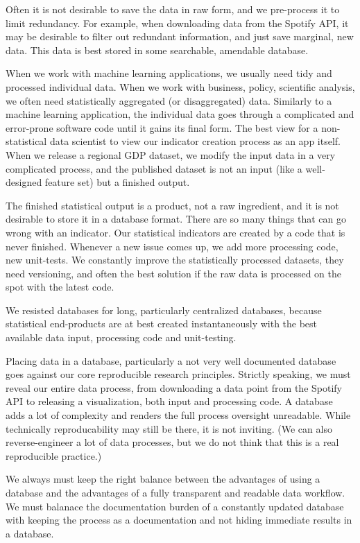 \documentclass[
  fontsize=13pt,
  english,
  a4paper,
  openany, a4paper, oneside]{article}
\begin{document}
Often it is not desirable to save the data in raw form, and we pre-process it to limit redundancy. For example, when downloading data from the Spotify API, it may be desirable to filter out redundant information, and just save marginal, new data. This data is best stored in some searchable, amendable database.

When we work with machine learning applications, we usually need tidy and processed individual data. When we work with business, policy, scientific analysis, we often need statistically aggregated (or disaggregated) data. Similarly to a machine learning application, the individual data goes through a complicated and error-prone software code until it gains its final form. The best view for a non-statistical data scientist to view our indicator creation process as an app itself. When we release a regional GDP dataset, we modify the input data in a very complicated process, and the published dataset is not an input (like a well-designed feature set) but a finished output.

The finished statistical output is a product, not a raw ingredient, and it is not desirable to store it in a database format. There are so many things that can go wrong with an indicator. Our statistical indicators are created by a code that is never finished. Whenever a new issue comes up, we add more processing code, new unit-tests. We constantly improve the statistically processed datasets, they need versioning, and often the best solution if the raw data is processed on the spot with the latest code.

We resisted databases for long, particularly centralized databases, because statistical end-products are at best created instantaneously with the best available data input, processing code and unit-testing.

Placing data in a database, particularly a not very well documented database goes against our core reproducible research principles. Strictly speaking, we must reveal our entire data process, from downloading a data point from the Spotify API to releasing a visualization, both input and processing code. A database adds a lot of complexity and renders the full process oversight unreadable. While technically reproducability may still be there, it is not inviting. (We can also reverse-engineer a lot of data processes, but we do not think that this is a real reproducible practice.)

We always must keep the right balance between the advantages of using a database and the advantages of a fully transparent and readable data workflow. We must balanace the documentation burden of a constantly updated database with keeping the process as a documentation and not hiding immediate results in a database.
\end{document}
